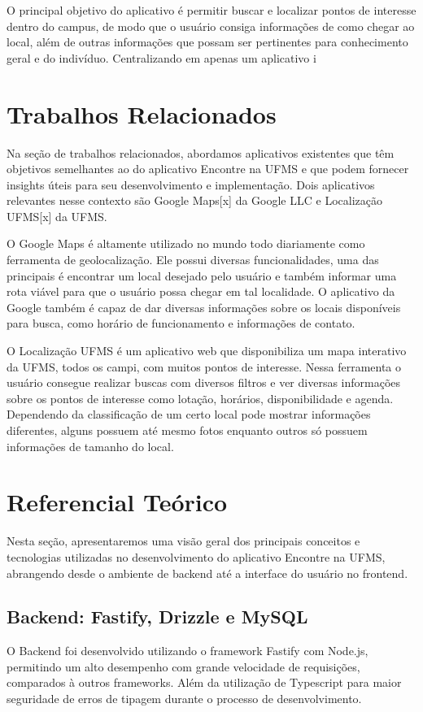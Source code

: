 \documentclass[12pt]{article}
\begin{document}
O principal objetivo do aplicativo é permitir buscar e localizar pontos de interesse dentro do campus, de modo que o usuário consiga informações de como chegar ao local, além de outras informações que possam ser pertinentes para conhecimento geral e do indivíduo. Centralizando em apenas um aplicativo i

\section{Trabalhos Relacionados}

Na seção de trabalhos relacionados, abordamos aplicativos existentes que têm objetivos semelhantes ao do aplicativo Encontre na UFMS e que podem fornecer insights úteis para seu desenvolvimento e implementação. Dois aplicativos relevantes nesse contexto são Google Maps[x] da Google LLC e Localização UFMS[x] da UFMS.

O Google Maps é altamente utilizado no mundo todo diariamente como ferramenta de geolocalização. Ele possui diversas funcionalidades, uma das principais é encontrar um local desejado pelo usuário e também informar uma rota viável para que o usuário possa chegar em tal localidade. O aplicativo da Google também é capaz de dar diversas informações sobre os locais disponíveis para busca, como horário de funcionamento e informações de contato.

O Localização UFMS é um aplicativo web que disponibiliza um mapa interativo da UFMS, todos os campi, com muitos pontos de interesse. Nessa ferramenta o usuário consegue realizar buscas com diversos filtros e ver diversas informações sobre os pontos de interesse como lotação, horários, disponibilidade e agenda. Dependendo da classificação de um certo local pode mostrar informações diferentes, alguns possuem até mesmo fotos enquanto outros só possuem informações de tamanho do local. 

\section{Referencial Teórico}

Nesta seção, apresentaremos uma visão geral dos principais conceitos e tecnologias utilizadas no desenvolvimento do aplicativo Encontre na UFMS, abrangendo desde o ambiente de backend até a interface do usuário no frontend.

\subsection{Backend: Fastify, Drizzle e MySQL}
O Backend foi desenvolvido utilizando o framework Fastify com Node.js, permitindo um alto desempenho com grande velocidade de requisições, comparados à outros frameworks. Além da utilização de Typescript para maior seguridade de erros de tipagem durante o processo de desenvolvimento.
\end{document}
